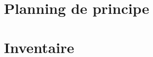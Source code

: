 \documentclass[asi]{picINSA}
\begin{document}
\begin{appendix}
\chapter{Planning de principe}
\label{annexePlanningDePrincipe}

\chapter{Inventaire}
\label{annexeInventaire}

	
\listoffigures
{}
	 
\listoftables
{}
\end{appendix}
\pageQuatriemeCouverture
\end{document}
